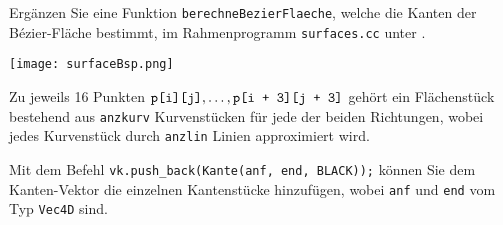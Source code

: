 \label{aufgabe:bezierflaeche}
%
Ergänzen Sie eine Funktion \texttt{berechneBezierFlaeche}, welche die 
Kanten der B\'{e}zier-Fläche bestimmt, im Rahmenprogramm 
\texttt{surfaces.cc} unter .

\begin{center}
  \texttt{[image: surfaceBsp.png]}
\end{center}

Zu jeweils 16 Punkten
$\text{\texttt{p[i][j]}}, \ldots, \text{\texttt{p[i + 3][j + 3]}}$ 
gehört ein Flächenstück bestehend aus \texttt{anzkurv} Kurvenstücken für 
jede der beiden Richtungen, wobei jedes Kurvenstück durch 
\texttt{anzlin} Linien approximiert wird.

Mit dem Befehl \texttt{vk.push\_back(Kante(anf, end, BLACK));} können 
Sie dem Kanten-Vektor die einzelnen Kantenstücke hinzufügen, wobei 
\texttt{anf} und \texttt{end} vom Typ \texttt{Vec4D} sind.
